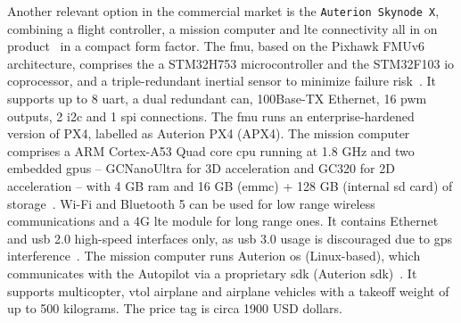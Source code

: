 Another relevant option in the commercial market is the \lstinline{Auterion Skynode X},
combining a flight controller, a mission computer and \gls{lte} connectivity all
in on product~\cite{skynodeXWebsite} in a compact form factor.
%
The \gls{fmu}, based on the Pixhawk FMUv6 architecture, comprises the 
a STM32H753 microcontroller and the STM32F103 \gls{io} coprocessor, and a
triple-redundant inertial sensor to minimize failure risk~\cite{skynodeXDatasheet}.
It supports up to 8 \gls{uart}, a dual redundant \gls{can},
100Base-TX Ethernet, 16 \gls{pwm} outputs, 2 \gls{i2c} and 1 \gls{spi}
connections. The \gls{fmu} runs an enterprise-hardened version of PX4, labelled
as Auterion PX4 (APX4)\cite{skynodeXDatasheet}.
%
%
The mission computer comprises a ARM Cortex-A53 Quad core \gls{cpu} running at
1.8 GHz and two embedded \glspl{gpu} -- GCNanoUltra for 3D acceleration and GC320 for
2D acceleration -- with 4 GB \gls{ram} and 16 GB (\gls{emmc}) + 128 GB (internal
\gls{sd} card) of storage~\cite{skynodeXDatasheet}. Wi-Fi and Bluetooth 5 can be used for low range
wireless communications and a 4G \gls{lte} module for long range ones. It
contains Ethernet and \gls{usb} 2.0 high-speed interfaces only, as \gls{usb} 3.0 usage is discouraged
due to \gls{gps} interference~\cite{skynodeXDatasheet}.
The mission computer runs Auterion
\gls{os} (Linux-based), which communicates with the Autopilot via a proprietary
\gls{sdk} (Auterion \gls{sdk})~\cite{skynodeX-px4}.
%
It supports multicopter, \gls{vtol} airplane and airplane vehicles with a
takeoff weight of up to 500 kilograms. The price tag is circa 1900 USD
dollars\cite{skynodePrice}.

